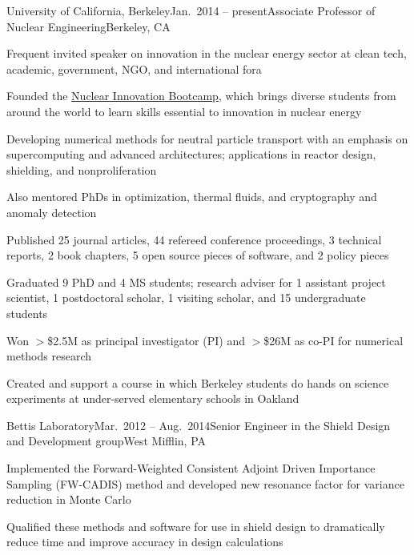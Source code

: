 \begin{rSubsection}{University of California, Berkeley}{Jan.\ 2014 -- present}{Associate Professor of Nuclear Engineering}{Berkeley, CA}
\item Frequent invited speaker on innovation in the nuclear energy sector at clean tech, academic, government, NGO, and international fora
\item Founded the \href{https://www.nuclearinnovationbootcamp.org/}{Nuclear Innovation Bootcamp}, which brings diverse students from around the world to learn skills essential to innovation in nuclear energy 
\item Developing numerical methods for neutral particle transport with an emphasis on supercomputing and advanced architectures; applications in reactor design, shielding, and nonproliferation
\item Also mentored PhDs in optimization, thermal fluids, and cryptography and anomaly detection 
\item Published 25 journal articles, 44 refereed conference proceedings, 3 technical reports, 2 book chapters, 5 open source pieces of software, and 2 policy pieces
\item Graduated 9 PhD and 4 MS students; research adviser for 1 assistant project scientist, 1 postdoctoral scholar, 1 visiting scholar, and 15 undergraduate students
\item Won $>$\$2.5M as principal investigator (PI) and $>$\$26M as co-PI for numerical methods research
\item Created and support a course in which Berkeley students do hands on science experiments at under-served elementary schools in Oakland
\end{rSubsection}


\clearpage
\begin{rSubsection}{Bettis Laboratory}{Mar.\ 2012 -- Aug.\ 2014}{Senior Engineer in the Shield Design and Development group}{West Mifflin, PA}
\item Implemented the Forward-Weighted Consistent Adjoint Driven Importance Sampling (FW-CADIS) method and developed new resonance factor for variance reduction in Monte Carlo
\item Qualified these methods and software for use in shield design to dramatically reduce time and improve accuracy in design calculations
\end{rSubsection}

